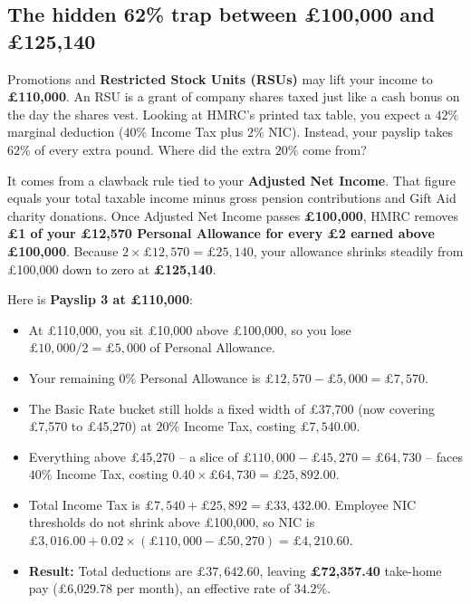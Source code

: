 \subsection{The hidden 62\% trap between \pounds 100,000 and \pounds 125,140}

Promotions and \textbf{Restricted Stock Units (RSUs)} may lift your income to \textbf{\pounds 110,000}. An RSU is a grant of company shares taxed just like a cash bonus on the day the shares vest. Looking at HMRC's printed tax table, you expect a $42\%$ marginal deduction ($40\%$ Income Tax plus $2\%$ NIC). Instead, your payslip takes $62\%$ of every extra pound. Where did the extra $20\%$ come from?

It comes from a clawback rule tied to your \textbf{Adjusted Net Income}. That figure equals your total taxable income minus gross pension contributions and Gift Aid charity donations. Once Adjusted Net Income passes \textbf{\pounds 100,000}, HMRC removes \textbf{\pounds 1 of your \pounds 12,570 Personal Allowance for every \pounds 2 earned above \pounds 100,000}. Because $2 \times \pounds 12{,}570 = \pounds 25{,}140$, your allowance shrinks steadily from \pounds 100,000 down to zero at \textbf{\pounds 125,140}.

Here is \textbf{Payslip 3 at \pounds 110,000}:
\begin{itemize}
  \item At \pounds 110,000, you sit \pounds 10,000 above \pounds 100,000, so you lose $\pounds 10{,}000 / 2 = \pounds 5{,}000$ of Personal Allowance.
  \item Your remaining $0\%$ Personal Allowance is $\pounds 12{,}570 - \pounds 5{,}000 = \pounds 7{,}570$.
  \item The Basic Rate bucket still holds a fixed width of \pounds 37,700 (now covering \pounds 7,570 to \pounds 45,270) at $20\%$ Income Tax, costing $\pounds 7{,}540.00$.
  \item Everything above \pounds 45,270 -- a slice of $\pounds 110{,}000 - \pounds 45{,}270 = \pounds 64{,}730$ -- faces $40\%$ Income Tax, costing $0.40 \times \pounds 64{,}730 = \pounds 25{,}892.00$.
  \item Total Income Tax is $\pounds 7{,}540 + \pounds 25{,}892 = \pounds 33{,}432.00$. Employee NIC thresholds do not shrink above \pounds 100,000, so NIC is $\pounds 3{,}016.00 + 0.02 \times (\pounds 110{,}000 - \pounds 50{,}270) = \pounds 4{,}210.60$.
  \item \textbf{Result:} Total deductions are $\pounds 37{,}642.60$, leaving \textbf{\pounds 72,357.40} take-home pay (\pounds 6,029.78 per month), an effective rate of \textbf{$34.2\%$}.
\end{itemize}

